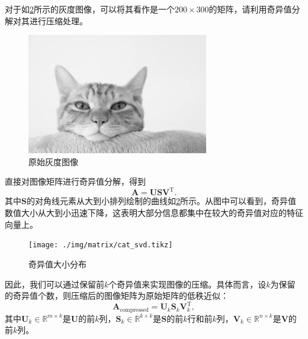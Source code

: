\begin{example}
    对于如\cref{fig_singular_values}所示的灰度图像，可以将其看作是一个\( 200 \times 300 \)的矩阵，请利用奇异值分解对其进行压缩处理。
    \begin{figure}[htb!]
        \centering
        \includegraphics[width=.3\textwidth]{./img/matrix/cat_g.jpg}
        \caption{原始灰度图像}
        \label{fig_cat_gray}
    \end{figure}
\end{example}
\begin{solution}
    直接对图像矩阵进行奇异值分解，得到
    \[
        \mathbf{A} = \mathbf{U} \mathbf{S} \mathbf{V}^{\mathrm{T}}.
    \]
    其中\( \mathbf{S} \)的对角线元素从大到小排列绘制的曲线如\cref{fig_singular_values}所示。从图中可以看到，奇异值数值大小从大到小迅速下降，这表明大部分信息都集中在较大的奇异值对应的特征向量上。
    \begin{figure}[htb!]
        \centering
        \texttt{[image: ./img/matrix/cat\_svd.tikz]}
        \caption{奇异值大小分布}
        \label{fig_singular_values}
    \end{figure}

    因此，我们可以通过保留前\( k \)个奇异值来实现图像的压缩。具体而言，设\( k \)为保留的奇异值个数，则压缩后的图像矩阵为原始矩阵的低秩近似：
    \[
        \mathbf{A}_{\text{compressed}} = \mathbf{U}_{k} \mathbf{S}_{k} \mathbf{V}_{k}^{\mathrm{T}},
    \]
    其中\( \mathbf{U}_k \in \mathbb{R}^{m \times k} \)是\( \mathbf{U} \)的前\( k \)列，\( \mathbf{S}_k \in \mathbb{R}^{k \times k} \)是\( \mathbf{S} \)的前\( k \)行和前\( k \)列，\( \mathbf{V}_k \in \mathbb{R}^{n \times k} \)是\( \mathbf{V} \)的前\( k \)列。


\end{solution}
